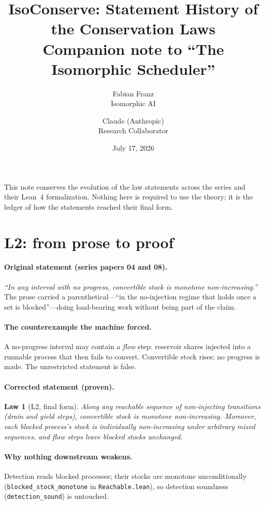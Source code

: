 \documentclass[11pt]{article}
\title{IsoConserve: Statement History of the Conservation Laws\\
\large Companion note to ``The Isomorphic Scheduler''}
\author{Fabian Franz\\Isomorphic AI \and Claude (Anthropic)\\Research Collaborator}
\date{July 17, 2026}
\newtheorem{law}{Law}
\begin{document}
\maketitle

\noindent This note conserves the evolution of the law statements
across the series and their Lean~4 formalization. Nothing here is
required to use the theory; it is the ledger of how the statements
reached their final form.

\section{L2: from prose to proof}

\paragraph{Original statement (series papers 04 and 08).}
\emph{``In any interval with no progress, convertible stock is monotone
non-increasing.''} The prose carried a parenthetical---``in the
no-injection regime that holds once a set is blocked''---doing
load-bearing work without being part of the claim.

\paragraph{The counterexample the machine forced.} A no-progress
interval may contain a \emph{flow} step: reservoir shares injected into
a runnable process that then fails to convert. Convertible stock rises;
no progress is made. The unrestricted statement is false.

\paragraph{Corrected statement (proven).}
\begin{law}[L2, final form]
Along any reachable sequence of non-injecting transitions (drain and
yield steps), convertible stock is monotone non-increasing. Moreover,
each \emph{blocked} process's stock is individually non-increasing
under arbitrary mixed sequences, and flow steps leave blocked stocks
unchanged.
\end{law}

\paragraph{Why nothing downstream weakens.} Detection reads blocked
processes; their stocks are monotone unconditionally
(\texttt{blocked\_stock\_monotone} in \texttt{Reachable.lean}), so
detection soundness (\texttt{detection\_sound}) is untouched.
\end{document}
